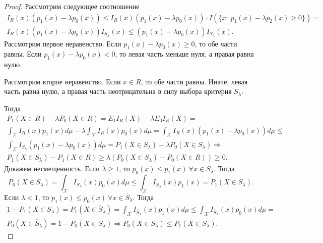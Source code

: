 \begin{proof}
    Рассмотрим следующее соотношение
    \begin{gather*}
        I_{R}( x)( p_{1}( x) -\lambda p_{0}( x)) \leqslant I_{R}( x)( p_{1}( x) -\lambda p_{0}( x)) \cdotp I(\{x:\ p_{1}( x) -\lambda p_{2}( x) \geqslant 0\}) =\\
        I_{R}( x)( p_{1}( x) -\lambda p_{0}( x)) I_{S_{\lambda }}( x) \leqslant ( p_{1}( x) -\lambda p_{0}( x)) I_{S_{\lambda }}( x) .
    \end{gather*}
    Рассмотрим первое неравенство. Если $\displaystyle p_{1}( x) -\lambda p_{0}( x) \geqslant 0$, то обе части равны. Если $\displaystyle p_{1}( x) -\lambda p_{0}( x) < 0$, то левая часть меньше нуля, а правая равна нулю.
    
    Рассмотрим второе неравенство. Если $\displaystyle x\in R$, то обе части равны. Иначе, левая часть равна нулю, а правая часть неотрицательна в силу выбора критерия $\displaystyle S_{\lambda }$.
    
    Тогда
    \begin{gather*}
        P_{1}( X\in R) -\lambda P_{0}( X\in R) =E_{1} I_{R}( X) -\lambda E_{0} I_{R}( X) =\\
        \int _{\mathcal{X}} I_{R}( x) p_{1}( x) d\mu -\lambda \int _{\mathcal{X}} I_{R}( x) p_{0}( x) d\mu =\int _{\mathcal{X}} I_{R}( x)( p_{1}( x) -\lambda p_{0}( x)) d\mu \leqslant \\
        \int _{\mathcal{X}} I_{S_{\lambda }}( p_{1}( x) -\lambda p_{0}( x)) d\mu =P_{1}( X\in S_{\lambda }) -\lambda P_{0}( X\in S_{\lambda }) \Rightarrow \\
        P_{1}( X\in S_{\lambda }) -P_{1}( X\in R) \geqslant \lambda ( P_{0}( X\in S_{\lambda }) -P_{0}( X\in R)) \geqslant 0.
    \end{gather*}
    Докажем несмещенность. Если $\displaystyle \lambda \geqslant 1$, то $\displaystyle p_{0}( x) \leqslant p_{1}( x) \ \forall x\in S_{\lambda }$. Тогда
    \begin{equation*}
        P_{0}( X\in S_{\lambda }) =\int _{\mathcal{X}} I_{S_{\lambda }}( x) p_{0}( x) d\mu \leqslant \int _{\mathcal{X}} I_{S_{\lambda }}( x) p_{1}( x) =P_{1}( X\in S_{\lambda }) .
    \end{equation*}
    Если $\displaystyle \lambda < 1$, то $\displaystyle p_{1}( x) \leqslant p_{0}( x) \ \forall x\in \overline{S}_{\lambda }$. Тогда
    \begin{gather*}
        1-P_{1}( X\in S_{\lambda }) =P_{1}( X\in \overline{S}_{\lambda }) =\int _{\mathcal{X}} I_{\overline{S}_{\lambda }}( x) p_{1}( x) d\mu \leqslant \int _{\mathcal{X}} I_{\overline{S}_{\lambda }}( x) p_{0}( x) d\mu =\\
        P_{0}( X\in \overline{S}_{\lambda }) =1-P_{0}( X\in S_{\lambda }) \Rightarrow P_{0}( X\in S_{\lambda }) \leqslant P_{1}( X\in S_{\lambda }) .
    \end{gather*}
\end{proof}
